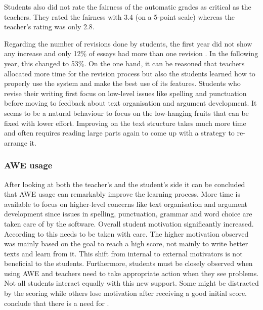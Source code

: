 \documentclass[runningheads]{llncs}
\begin{document}
Students also did not rate the fairness of the automatic grades as critical as the teachers. They rated the fairness with 3.4 (on a 5-point scale) whereas the teacher's rating was only 2.8.

Regarding the number of revisions done by students, the first year did not show any increase and only 12\% of essays had more than one revision \citep{grimes_utility_2010}. In the following year, this changed to 53\%. On the one hand, it can be reasoned that teachers allocated more time for the revision process but also the students learned how to properly use the system and make the best use of its features. Students who revise their writing first focus on low-level issues like spelling and punctuation before moving to feedback about text organisation and argument development. It seems to be a natural behaviour to focus on the low-hanging fruits that can be fixed with lower effort. Improving on the text structure takes much more time and often requires reading large parts again to come up with a strategy to re-arrange it.

\subsubsection{AWE usage} After looking at both the teacher's and the student's side it can be concluded that AWE usage can remarkably improve the learning process. More time is available to focus on higher-level concerns like text organisation and argument development since issues in spelling, punctuation, grammar and word choice are taken care of by the software. Overall student motivation significantly increased. According to \textcite{grimes_utility_2010} this needs to be taken with care. The higher motivation observed was mainly based on the goal to reach a high score, not mainly to write better texts and learn from it. This shift from internal to external motivators is not beneficial to the students. Furthermore, students must be closely observed when using AWE and teachers need to take appropriate action when they see problems. Not all students interact equally with this new support. Some might be distracted by the scoring while others lose motivation after receiving a good initial score. \citeauthor{grimes_utility_2010} conclude that there is a need for .
\end{document}

